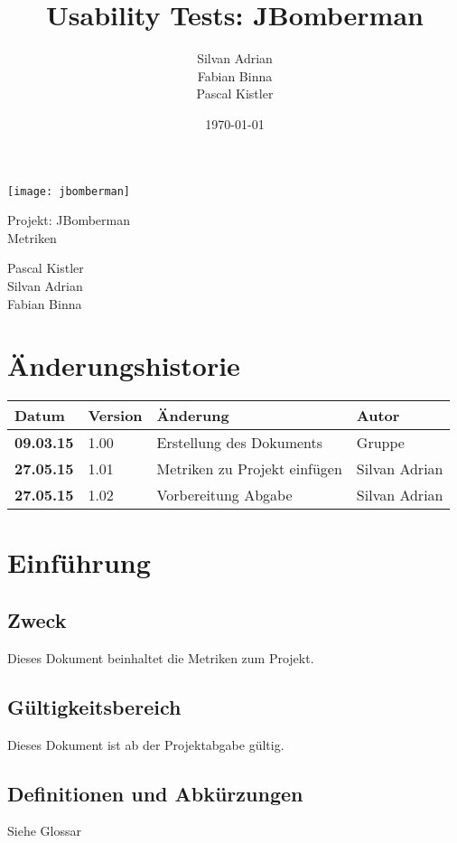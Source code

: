 \documentclass[11pt]{scrartcl}
\title{Usability Tests: JBomberman}
\author{Silvan Adrian \\ Fabian Binna \\ Pascal Kistler}
\date{\today{}}
\begin{document}
\def\arraystretch{1.5}
\begin{titlepage}
\begin{center}
\vspace{10em}
\texttt{[image: jbomberman]}
\vspace{10em}
\end{center}
\begin{center}
\huge {Projekt: JBomberman} \\
\huge {Metriken}
\end{center}
\begin{center}
\vspace{10em}
\LARGE {Pascal Kistler} \\
\LARGE {Silvan Adrian} \\
\LARGE {Fabian Binna}
\end{center}

\end{titlepage}

\newpage
\section{Änderungshistorie}
\label{sec:Änderungen}

\begin{tabularx}{\linewidth}{l l l l}
\textbf{Datum} & \textbf{Version} & \textbf{Änderung}  & \textbf{Autor} \\
\hline
\textbf{09.03.15} & 1.00 & Erstellung des Dokuments & Gruppe \\
\textbf{27.05.15} & 1.01 & Metriken zu Projekt einfügen & Silvan Adrian \\
\textbf{27.05.15} & 1.02 & Vorbereitung Abgabe & Silvan Adrian\\
\end{tabularx}

\newpage
\tableofcontents
\newpage
\section{Einführung}
\subsection{Zweck}
Dieses Dokument beinhaltet die Metriken zum Projekt.
\subsection{Gültigkeitsbereich}
Dieses Dokument ist ab der Projektabgabe gültig.
\subsection{Definitionen und Abkürzungen}
Siehe Glossar
\end{document}
